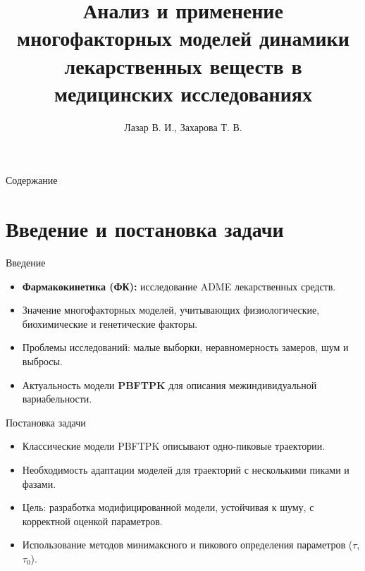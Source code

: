 \documentclass{beamer}
\title{Анализ и применение многофакторных моделей динамики лекарственных веществ в медицинских исследованиях}
\author{Лазар В. И., Захарова Т. В.}
\institute{ВМК МГУ}
\begin{document}
\begin{frame}
	\titlepage
\end{frame}

\begin{frame}{Содержание}
	\tableofcontents
\end{frame}

\section{Введение и постановка задачи}
\begin{frame}{Введение}
	\begin{itemize}
		\item \textbf{Фармакокинетика (ФК):} исследование ADME лекарственных средств.
		\item Значение многофакторных моделей, учитывающих физиологические, биохимические и генетические факторы.
		\item Проблемы исследований: малые выборки, неравномерность замеров, шум и выбросы.
		\item Актуальность модели \textbf{PBFTPK} для описания межиндивидуальной вариабельности.
	\end{itemize}
\end{frame}

\begin{frame}{Постановка задачи}
	\begin{itemize}
		\item Классические модели PBFTPK описывают одно-пиковые траектории.
		\item Необходимость адаптации моделей для траекторий с несколькими пиками и фазами.
		\item Цель: разработка модифицированной модели, устойчивая к шуму, с корректной оценкой параметров.
		\item Использование методов минимаксного и пикового определения параметров ($\tau$, $\tau_0$).
	\end{itemize}
\end{frame}

\end{document}
